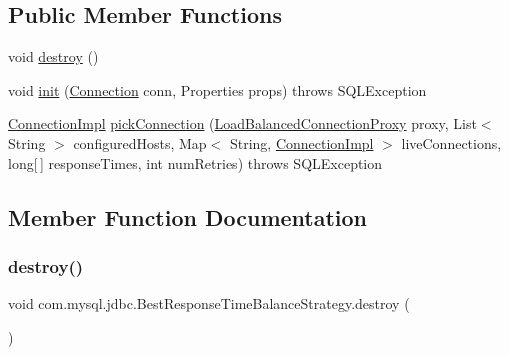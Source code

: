 \subsection*{Public Member Functions}
\begin{DoxyCompactItemize}
\item 
void \mbox{\hyperlink{classcom_1_1mysql_1_1jdbc_1_1_best_response_time_balance_strategy_abca1d34e1d2d4a452109cec3b1d4236f}{destroy}} ()
\item 
void \mbox{\hyperlink{classcom_1_1mysql_1_1jdbc_1_1_best_response_time_balance_strategy_ac8018473ac870dfb7c67f51092cd0261}{init}} (\mbox{\hyperlink{interfacecom_1_1mysql_1_1jdbc_1_1_connection}{Connection}} conn, Properties props)  throws S\+Q\+L\+Exception 
\item 
\mbox{\hyperlink{classcom_1_1mysql_1_1jdbc_1_1_connection_impl}{Connection\+Impl}} \mbox{\hyperlink{classcom_1_1mysql_1_1jdbc_1_1_best_response_time_balance_strategy_ad59590e6022784ddedcfb060173aed21}{pick\+Connection}} (\mbox{\hyperlink{classcom_1_1mysql_1_1jdbc_1_1_load_balanced_connection_proxy}{Load\+Balanced\+Connection\+Proxy}} proxy, List$<$ String $>$ configured\+Hosts, Map$<$ String, \mbox{\hyperlink{classcom_1_1mysql_1_1jdbc_1_1_connection_impl}{Connection\+Impl}} $>$ live\+Connections, long\mbox{[}$\,$\mbox{]} response\+Times, int num\+Retries)  throws S\+Q\+L\+Exception 
\end{DoxyCompactItemize}


\subsection{Member Function Documentation}
\mbox{\label{classcom_1_1mysql_1_1jdbc_1_1_best_response_time_balance_strategy_abca1d34e1d2d4a452109cec3b1d4236f}} 
\subsubsection{\texorpdfstring{destroy()}{destroy()}}
{\footnotesize\ttfamily void com.\+mysql.\+jdbc.\+Best\+Response\+Time\+Balance\+Strategy.\+destroy (\begin{DoxyParamCaption}{ }\end{DoxyParamCaption})}

